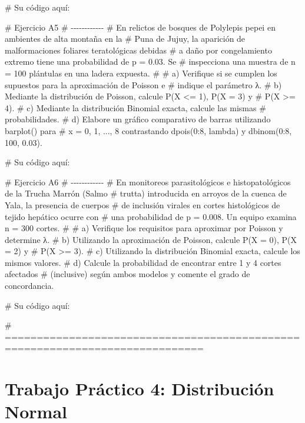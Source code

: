 \documentclass[
  spanish,
  letterpaper,
  DIV=11,
  numbers=noendperiod]{scrreprt}
\newenvironment{Shaded}{\begin{snugshade}}{\end{snugshade}}
\newcommand{\CommentTok}[1]{\textcolor[rgb]{0.37,0.37,0.37}{#1}}
\begin{document}
\begin{Shaded}
\begin{Highlighting}[]
\CommentTok{\# Su código aquí:}


\CommentTok{\# Ejercicio A5}
\CommentTok{\# {-}{-}{-}{-}{-}{-}{-}{-}{-}{-}{-}{-}}
\CommentTok{\# En relictos de bosques de Polylepis pepei en ambientes de alta montaña en la}
\CommentTok{\# Puna de Jujuy, la aparición de malformaciones foliares teratológicas debidas}
\CommentTok{\# a daño por congelamiento extremo tiene una probabilidad de p = 0.03. Se}
\CommentTok{\# inspecciona una muestra de n = 100 plántulas en una ladera expuesta.}
\CommentTok{\#}
\CommentTok{\# a) Verifique si se cumplen los supuestos para la aproximación de Poisson e}
\CommentTok{\#    indique el parámetro λ.}
\CommentTok{\# b) Mediante la distribución de Poisson, calcule P(X \textless{}= 1), P(X = 3) y}
\CommentTok{\#    P(X \textgreater{}= 4).}
\CommentTok{\# c) Mediante la distribución Binomial exacta, calcule las mismas}
\CommentTok{\#    probabilidades.}
\CommentTok{\# d) Elabore un gráfico comparativo de barras utilizando barplot() para}
\CommentTok{\#    x = 0, 1, ..., 8 contrastando dpois(0:8, lambda) y dbinom(0:8, 100, 0.03).}

\CommentTok{\# Su código aquí:}


\CommentTok{\# Ejercicio A6}
\CommentTok{\# {-}{-}{-}{-}{-}{-}{-}{-}{-}{-}{-}{-}}
\CommentTok{\# En monitoreos parasitológicos e histopatológicos de la Trucha Marrón (Salmo}
\CommentTok{\# trutta) introducida en arroyos de la cuenca de Yala, la presencia de cuerpos}
\CommentTok{\# de inclusión virales en cortes histológicos de tejido hepático ocurre con}
\CommentTok{\# una probabilidad de p = 0.008. Un equipo examina n = 300 cortes.}
\CommentTok{\#}
\CommentTok{\# a) Verifique los requisitos para aproximar por Poisson y determine λ.}
\CommentTok{\# b) Utilizando la aproximación de Poisson, calcule P(X = 0), P(X = 2) y}
\CommentTok{\#    P(X \textgreater{}= 3).}
\CommentTok{\# c) Utilizando la distribución Binomial exacta, calcule los mismos valores.}
\CommentTok{\# d) Calcule la probabilidad de encontrar entre 1 y 4 cortes afectados}
\CommentTok{\#    (inclusive) según ambos modelos y comente el grado de concordancia.}

\CommentTok{\# Su código aquí:}


\CommentTok{\# =============================================================================}
\end{Highlighting}
\end{Shaded}


\chapter{Trabajo Práctico 4: Distribución
Normal}\label{trabajo-pruxe1ctico-4-distribuciuxf3n-normal}
\end{document}
